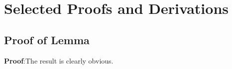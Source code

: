 
\chapter[SELECTED PROOFS AND DERIVATIONS]{Selected Proofs and Derivations}

\newpage
\section{Proof of Lemma}

\noindent \textbf{Proof}:\quad The result is clearly obvious.
